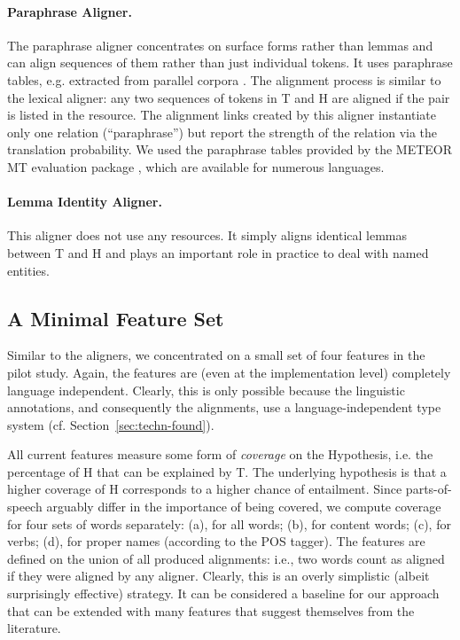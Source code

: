 \documentclass[11pt,letterpaper]{article}
\begin{document}
\paragraph{Paraphrase Aligner.} The paraphrase aligner concentrates on
surface forms rather than lemmas and can align sequences of them
rather than just individual tokens. It uses paraphrase tables, e.g.
extracted from parallel corpora
\cite{bannard05:_parap_bilin_paral_corpor}. The alignment process is
similar to the lexical aligner: any two sequences of tokens in T and H 
are aligned if the pair is listed in the resource.  The alignment
links created by this aligner instantiate only one relation
(``paraphrase'') but report the strength of the relation via the
translation probability. We used the paraphrase tables provided by the
METEOR MT evaluation package \cite{denkowski-lavie:2014:W14-33}, which
are available for numerous languages. 

\paragraph{Lemma Identity Aligner.} This aligner does not use any
resources. It simply aligns identical lemmas between T and H and plays
an important role in practice to deal with named entities.

\subsection{A Minimal Feature Set} 

Similar to the aligners, we concentrated on a small set of four
features in the pilot study. Again, the features are (even at the
implementation level) completely language independent. Clearly, this
is only possible because the linguistic annotations, and consequently
the alignments, use a language-independent type system
(cf. Section~\ref{sec:techn-found}).

All current features measure some form of \textit{coverage} on the
Hypothesis, i.e. the percentage of H that can be explained by T. The
underlying hypothesis is that a higher coverage of H corresponds to a
higher chance of entailment. Since parts-of-speech arguably differ in
the importance of being covered, we compute coverage for four sets of
words separately: (a), for all words; (b), for content words; (c), for
verbs; (d), for proper names (according to the POS tagger). The
features are defined on the union of all produced alignments: i.e.,
two words count as aligned if they were aligned by any aligner. 
Clearly, this is an overly simplistic (albeit surprisingly effective)
strategy. It can be considered a baseline for our approach that can be
extended with many features that suggest themselves from the
literature. 
\end{document}

